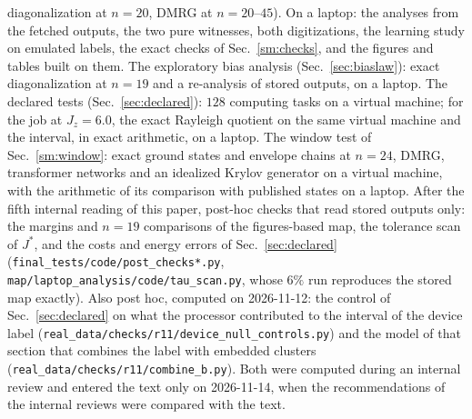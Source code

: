 \documentclass[aps,prx,onecolumn,10pt,nofootinbib,longbibliography,floatfix]{revtex4-2}
\theoremstyle{remark}
\newcommand{\Jz}{J_z}
\begin{document}
diagonalization at $n=20$, DMRG at $n=20$--$45$). On a laptop: the analyses from the fetched outputs, the two pure %
witnesses, both digitizations, the learning study on emulated labels, the exact checks of Sec.~\ref{sm:checks}, and
the figures and tables built on them. The exploratory bias analysis (Sec.~\ref{sec:biaslaw}): exact diagonalization at $n=19$ and a %
re-analysis of stored outputs, on a laptop. The declared tests (Sec.~\ref{sec:declared}): $128$ computing tasks on a %
virtual machine; for the job at $\Jz=6.0$, the exact Rayleigh quotient on the same virtual machine and the interval, in %
exact arithmetic, on a laptop.
The window test of Sec.~\ref{sm:window}: exact ground states and envelope chains at $n=24$, DMRG, %
transformer networks and an idealized Krylov generator on a virtual machine, with the arithmetic of its comparison
with published states on a laptop. After the fifth internal reading of this paper, post-hoc checks that read stored outputs only: the margins
and $n=19$ comparisons of the figures-based map, the tolerance scan of $J^*$, and the costs and energy errors of
Sec.~\ref{sec:declared} (\texttt{final\_tests/code/post\_checks*.py}, \texttt{map/laptop\_analysis/code/tau\_scan.py},
whose $6\%$ run reproduces the stored map exactly). %
Also post hoc, computed on 2026-11-12: the control of Sec.~\ref{sec:declared} on what the processor contributed to %
the interval of the device label (\texttt{real\_data/checks/r11/device\_null\_controls.py}) and the model of that
section that combines the label with embedded clusters (\texttt{real\_data/checks/r11/combine\_b.py}). Both were
computed during an internal review and entered the text only on 2026-11-14, when the recommendations of the %
internal reviews were compared with the text.
\end{document}
